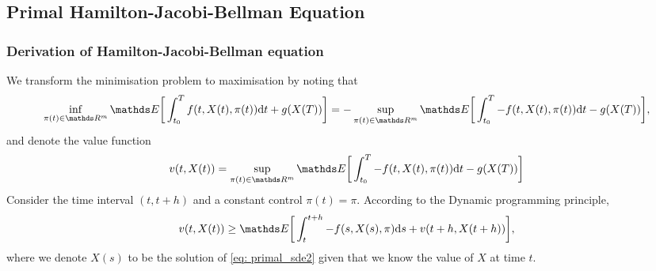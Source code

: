 
\subsection{Primal Hamilton-Jacobi-Bellman Equation}

\subsubsection{Derivation of Hamilton-Jacobi-Bellman equation}
We transform the minimisation problem to maximisation by noting that
\begin{equation*}
     \inf_{\pi(t) \in \R^m} \E \bigg[ \int_{t_0}^T f(t, X(t), \pi(t)) \d t + g(X(T))\bigg] = - \sup_{\pi(t) \in \R^m} \E \bigg[ \int_{t_0}^T - f(t, X(t), \pi(t)) \d t - g(X(T))\bigg],
\end{equation*}
and denote the value function 
\begin{equation}
    v(t, X(t)) = \sup_{\pi(t) \in \R^m} \E \bigg[ \int_{t_0}^T - f(t, X(t), \pi(t)) \d t - g(X(T))\bigg]
\end{equation}
Consider the time interval $(t, t + h)$ and a constant control $\pi(t) = \pi$. According to the Dynamic programming principle,
\begin{equation}
    v(t, X(t)) \ge \E \bigg[ \int_{t}^{t+h} - f(s, X(s), \pi) \d s + v(t+h, X(t + h)) \bigg],
    \label{eq: 1}
\end{equation}
where we denote $X(s)$ to be the solution of \eqref{eq: primal_sde2} given that we know the value of $X$ at time $t$.\\

